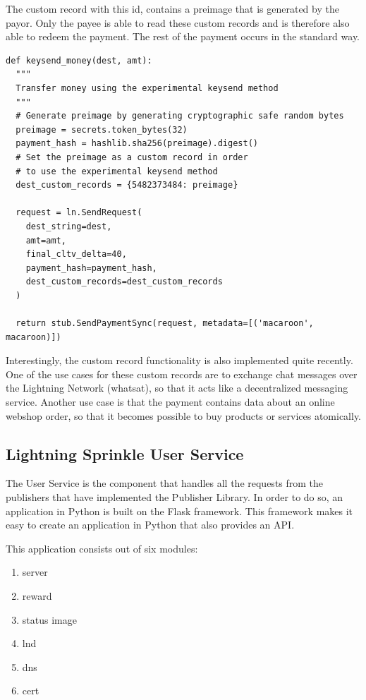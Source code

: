 The custom record with this id, contains a preimage that is generated by the payor. Only the payee is able to read these custom records and is therefore also able to redeem the payment. The rest of the payment occurs in the standard way.
\lstset{language=Python}
\lstset{frame=lines}
\lstset{basicstyle=\footnotesize}
\begin{lstlisting}
def keysend_money(dest, amt):
  """ 
  Transfer money using the experimental keysend method
  """
  # Generate preimage by generating cryptographic safe random bytes
  preimage = secrets.token_bytes(32) 
  payment_hash = hashlib.sha256(preimage).digest()
  # Set the preimage as a custom record in order 
  # to use the experimental keysend method
  dest_custom_records = {5482373484: preimage}

  request = ln.SendRequest(
    dest_string=dest,
    amt=amt,
    final_cltv_delta=40,
    payment_hash=payment_hash,
    dest_custom_records=dest_custom_records
  )
  
  return stub.SendPaymentSync(request, metadata=[('macaroon', macaroon)])

\end{lstlisting}

Interestingly, the custom record functionality is also implemented quite recently. One of the use cases for these custom records are to exchange chat messages over the Lightning Network (whatsat), so that it acts like a decentralized messaging service. Another use case is that the payment contains data about an online webshop order, so that it becomes possible to buy products or services atomically.


\subsection{Lightning Sprinkle User Service}

The User Service is the component that handles all the requests from the publishers that have implemented the Publisher Library. In order to do so, an application in Python is built on the Flask framework. This framework makes it easy to create an application in Python that also provides an API.

This application consists out of six modules:
\begin{enumerate}
  \item server
  \item reward
  \item status image
  \item lnd
  \item dns
  \item cert 
\end{enumerate}

